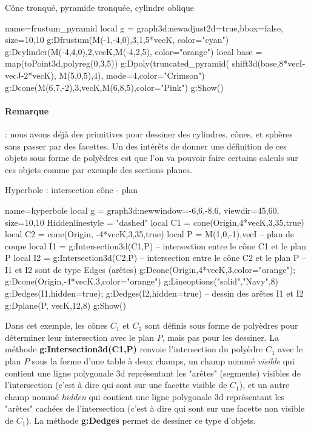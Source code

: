 \begin{demo}{Cône tronqué, pyramide tronquée, cylindre oblique}
\begin{luadraw}{name=frustum_pyramid}
local g = graph3d:new{adjust2d=true,bbox=false, size={10,10} }
g:Dfrustum(M(-1,-4,0),3,1,5*vecK, {color="cyan"})
g:Dcylinder(M(-4,4,0),2,vecK,M(-4,2,5), {color="orange"})
local base = map(toPoint3d,polyreg(0,3,5))
g:Dpoly(truncated_pyramid( shift3d(base,8*vecI-vecJ-2*vecK), M(5,0,5),4), {mode=4,color="Crimson"})
g:Dcone(M(6,7,-2),3,vecK,M(6,8,5),{color="Pink"})
g:Show()            
\end{luadraw}
\end{demo}

\paragraph{Remarque} : nous avons déjà des primitives pour dessiner des cylindres, cônes, et sphères sans passer par des facettes. Un des intérêts de donner une définition de ces objets sous forme de polyèdres est que l'on va pouvoir faire certains calculs sur ces objets comme par exemple des sections planes.

\begin{demo}{Hyperbole : intersection cône - plan}
\begin{luadraw}{name=hyperbole}
local g = graph3d:new{window={-6,6,-8,6}, viewdir={45,60}, size={10,10}}
Hiddenlinestyle = "dashed"
local C1 = cone(Origin,4*vecK,3,35,true)
local C2 = cone(Origin, -4*vecK,3,35,true)
local P = {M(1,0,-1),vecI} -- plan de coupe
local I1 = g:Intersection3d(C1,P) -- intersection entre le cône C1 et le plan P
local I2 = g:Intersection3d(C2,P) -- intersection entre le cône C2 et le plan P
-- I1 et I2 sont de type Edges (arêtes)
g:Dcone(Origin,4*vecK,3,{color="orange"}); g:Dcone(Origin,-4*vecK,3,{color="orange"})
g:Lineoptions("solid","Navy",8)
g:Dedges(I1,{hidden=true}); g:Dedges(I2,{hidden=true}) -- dessin des arêtes I1 et I2
g:Dplane(P, vecK,12,8)
g:Show()
\end{luadraw}
\end{demo}

Dans cet exemple, les cônes $C_1$ et $C_2$ sont définis sous forme de polyèdres pour déterminer leur intersection avec le plan $P$, mais pas pour les dessiner. La méthode \textbf{g:Intersection3d(C1,P)} renvoie l'intersection du polyèdre $C_1$ avec le plan $P$ sous la forme d'une table à deux champs, un champ nommé \emph{visible} qui contient une ligne polygonale 3d représentant les "arêtes" (segments) visibles de l'intersection (c'est à dire qui sont sur une facette visible de $C_1$), et un autre champ nommé \emph{hidden} qui contient une ligne polygonale 3d représentant les "arêtes" cachées de l'intersection (c'est à dire qui sont sur une facette non visible de $C_1$). La méthode \textbf{g:Dedges} permet de dessiner ce type d'objets.

